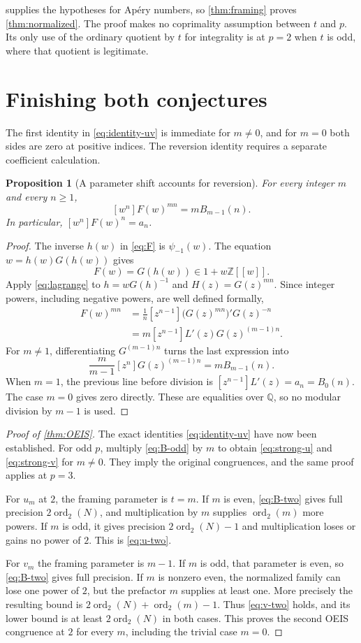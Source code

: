 \documentclass[11pt,letterpaper]{article}
\numberwithin{equation}{section}
\newtheorem{proposition}[proposition]{Proposition}
\theoremstyle{definition}
\theoremstyle{remark}
\newcommand{\Z}{\mathbb Z}
\newcommand{\Q}{\mathbb Q}
\newcommand{\vtwo}{\operatorname{ord}_2}
\begin{document}
 supplies the hypotheses for Ap\'ery numbers, so
\cref{thm:framing} proves \cref{thm:normalized}. The proof makes no
coprimality assumption between $t$ and $p$. Its only use of the
ordinary quotient by $t$ for integrality is at $p=2$ when $t$ is odd,
where that quotient is legitimate.

\section{Finishing both conjectures}\label{sec:finish}
The first identity in \eqref{eq:identity-uv} is immediate for $m\ne0$,
and for $m=0$ both sides are zero at positive indices. The reversion
identity requires a separate coefficient calculation.

\begin{proposition}[A parameter shift accounts for reversion]\label{prop:shift}
For every integer $m$ and every $n\ge1$,
\[
 [w^n]F(w)^{mn}=mB_{m-1}(n).
\]
In particular, $[w^n]F(w)^n=a_n$.
\end{proposition}
\begin{proof}
The inverse $h(w)$ in \eqref{eq:F} is $\psi_{-1}(w)$.
The equation $w=h(w)G(h(w))$ gives
\[
 F(w)=G(h(w))\in1+w\Z[[w]].
\]
Apply \eqref{eq:lagrange} to $h=wG(h)^{-1}$ and
$H(z)=G(z)^{mn}$. Since integer powers, including negative powers, are
well defined formally,
\begin{align*}
 [w^n]F(w)^{mn}
 &=\frac1n[z^{n-1}]\bigl(G(z)^{mn}\bigr)'G(z)^{-n}\\
 &=m[z^{n-1}]L'(z)G(z)^{(m-1)n}.
\end{align*}
For $m\ne1$, differentiating $G^{(m-1)n}$ turns the last expression into
\[
 \frac{m}{m-1}[z^n]G(z)^{(m-1)n}=mB_{m-1}(n).
\]
When $m=1$, the previous line before division is
$[z^{n-1}]L'(z)=a_n=B_0(n)$. The case $m=0$ gives zero directly.
These are equalities over $\Q$, so no modular division by $m-1$ is used.
\end{proof}

\begin{proof}[Proof of \cref{thm:OEIS}]
The exact identities \eqref{eq:identity-uv} have now been established.
For odd $p$, multiply \eqref{eq:B-odd} by $m$ to obtain
\eqref{eq:strong-u} and \eqref{eq:strong-v} for $m\ne0$. They imply the
original congruences, and the same proof applies at $p=3$.

For $u_m$ at $2$, the framing parameter is $t=m$. If $m$ is even,
\eqref{eq:B-two} gives full precision $2\vtwo(N)$, and multiplication
by $m$ supplies $\vtwo(m)$ more powers. If $m$ is odd, it gives precision
$2\vtwo(N)-1$ and multiplication loses or gains no power of $2$.
This is \eqref{eq:u-two}.

For $v_m$ the framing parameter is $m-1$. If $m$ is odd, that parameter
is even, so \eqref{eq:B-two} gives full precision. If $m$ is nonzero
even, the normalized family can lose one power of $2$, but the prefactor
$m$ supplies at least one. More precisely the resulting bound is
$2\vtwo(N)+\vtwo(m)-1$. Thus \eqref{eq:v-two} holds, and its lower bound
is at least $2\vtwo(N)$ in both cases. This proves the second OEIS
congruence at $2$ for every $m$, including the trivial case $m=0$.
\end{proof}
\end{document}
